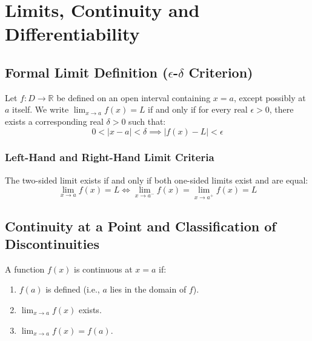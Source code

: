 \section{Limits, Continuity and Differentiability}

\subsection{Formal Limit Definition ($\epsilon$-$\delta$ Criterion)}

\begin{definition}
Let $f: D \to \mathbb{R}$ be defined on an open interval containing $x = a$, except possibly at $a$ itself. We write $\lim_{x\to a} f(x) = L$ if and only if for every real $\epsilon > 0$, there exists a corresponding real $\delta > 0$ such that:
\begin{equation}
    0 < |x - a| < \delta \implies |f(x) - L| < \epsilon
\end{equation}
\end{definition}

\subsubsection{Left-Hand and Right-Hand Limit Criteria}
The two-sided limit exists if and only if both one-sided limits exist and are equal:
\begin{equation}
    \lim_{x\to a} f(x) = L \iff \lim_{x\to a^-} f(x) = \lim_{x\to a^+} f(x) = L
\end{equation}

\subsection{Continuity at a Point and Classification of Discontinuities}

\begin{definition}
A function $f(x)$ is continuous at $x = a$ if:
\begin{enumerate}[leftmargin=1.5em]
    \item $f(a)$ is defined (i.e., $a$ lies in the domain of $f$).
    \item $\lim_{x\to a} f(x)$ exists.
    \item $\lim_{x\to a} f(x) = f(a)$.
\end{enumerate}
\end{definition}

